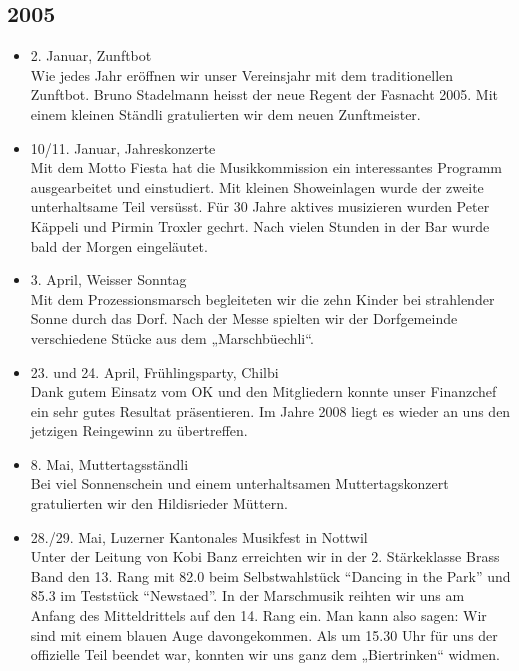 \subsection{2005}

\begin{history}


    \begin{itemize}

        \item 2. Januar, Zunftbot\\
              Wie jedes Jahr eröffnen wir unser Vereinsjahr mit dem traditionellen
              Zunftbot. Bruno Stadelmann heisst der neue Regent der Fasnacht 2005. Mit
              einem kleinen Ständli gratulierten wir dem neuen Zunftmeister.

        \item 10/11. Januar, Jahreskonzerte\\
              Mit dem Motto Fiesta hat die Musikkommission ein interessantes Programm
              ausgearbeitet und einstudiert. Mit kleinen Showeinlagen wurde der zweite
              unterhaltsame Teil versüsst. Für 30 Jahre aktives musizieren wurden
              Peter Käppeli und Pirmin Troxler gechrt. Nach vielen Stunden in der Bar
              wurde bald der Morgen eingeläutet.

        \item 3. April, Weisser Sonntag\\
              Mit dem Prozessionsmarsch begleiteten wir die zehn Kinder bei
              strahlender Sonne durch das Dorf. Nach der Messe spielten wir der
              Dorfgemeinde verschiedene Stücke aus dem „Marschbüechli“.

        \item 23. und 24. April, Frühlingsparty, Chilbi\\
              Dank gutem Einsatz vom OK und den
              Mitgliedern konnte unser Finanzchef ein sehr gutes Resultat präsentieren.
              Im Jahre 2008 liegt es wieder an uns den jetzigen Reingewinn zu
              übertreffen.

        \item 8. Mai, Muttertagsständli\\
              Bei viel Sonnenschein und einem unterhaltsamen Muttertagskonzert
              gratulierten wir den Hildisrieder Müttern.

        \item 28./29. Mai, Luzerner Kantonales Musikfest in Nottwil\\
              Unter der Leitung von Kobi Banz erreichten wir in der 2. Stärkeklasse
              Brass Band den 13. Rang mit 82.0 beim Selbstwahlstück \enquote{Dancing in the
                  Park} und 85.3 im Teststück \enquote{Newstaed}. In der Marschmusik reihten wir
              uns am Anfang des Mitteldrittels auf den 14. Rang ein. Man kann also
              sagen: Wir sind mit einem blauen Auge davongekommen. Als um 15.30 Uhr
              für uns der offizielle Teil beendet war, konnten wir uns ganz dem
              „Biertrinken“ widmen.


\end{itemize}
\end{history}
